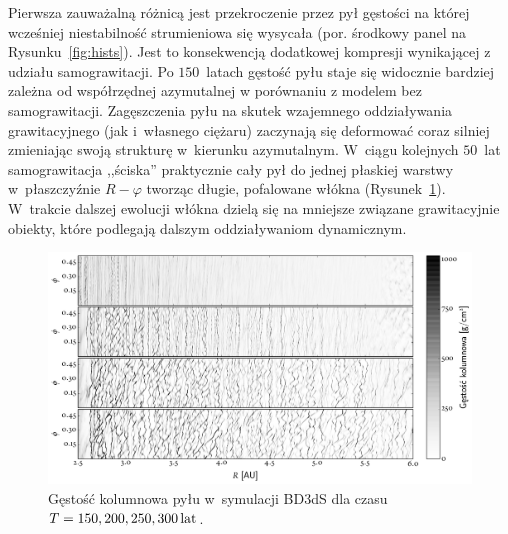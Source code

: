 %
\par Pierwsza zauważalną różnicą jest przekroczenie przez pył gęstości na której
wcześniej niestabilność strumieniowa się wysycała (por. środkowy panel na
Rysunku~\ref{fig:hists}). Jest to konsekwencją dodatkowej kompresji wynikającej
z udziału samograwitacji.
Po $150$~latach gęstość pyłu staje się widocznie bardziej
zależna od współrzędnej azymutalnej w porównaniu z modelem bez samograwitacji.
Zagęszczenia pyłu na skutek wzajemnego oddziaływania grawitacyjnego (jak
i~własnego ciężaru) zaczynają się deformować coraz silniej zmieniając swoją
strukturę w~kierunku azymutalnym. W~ciągu kolejnych $50$~lat samograwitacja
,,ściska'' praktycznie cały pył do jednej płaskiej warstwy w~płaszczyźnie $R -
\varphi$ tworząc długie, pofalowane włókna (Rysunek~\ref{fig:projs}). W~trakcie
dalszej ewolucji włókna dzielą się na mniejsze związane grawitacyjnie obiekty,
które podlegają dalszym oddziaływaniom dynamicznym. 
%
\begin{figure}
   \centering
   \includegraphics[width=0.95\linewidth]{figures/proj_sg}
   \caption{Gęstość kolumnowa pyłu w~symulacji BD3dS dla czasu $T=150, 200, 250,
   300\hbox{$\thinspace\textrm{lat}$}$.}
   \label{fig:projs}
\end{figure}
%
